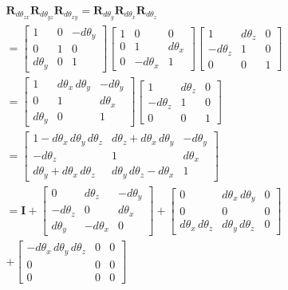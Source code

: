 \documentclass{article}      %
\newcommand{\BI}[0]{\mathbf{I}}
\newcommand{\BR}[0]{\mathbf{R}}
\begin{document}
\begin{multline*}
\BR_{d\theta_{zx}}
\BR_{d\theta_{yz}}
\BR_{d\theta_{xy}}
%
=
%
\BR_{d\theta_y}
\BR_{d\theta_x}
\BR_{d\theta_z} \\
%
=
%
\begin{bmatrix}
 1 & 0 & -d\theta_y \\
 0 & 1 & 0 \\
 d\theta_y & 0 & 1
\end{bmatrix}
\begin{bmatrix}
 1 & 0 & 0 \\
 0 & 1 & d\theta_x \\
 0 & -d\theta_x & 1
\end{bmatrix}
\begin{bmatrix}
1 & d\theta_z & 0 \\
-d\theta_z & 1 & 0 \\
0 & 0 & 1
\end{bmatrix} \\
%
=
%
\begin{bmatrix}
1 & d\theta_x\,d\theta_y & -d\theta_y \\
0 & 1 & d\theta_x \\
d\theta_y & 0 & 1
\end{bmatrix}
\begin{bmatrix}
1 & d\theta_z & 0 \\
-d\theta_z & 1 & 0 \\
0 & 0 & 1
\end{bmatrix} \\
%
=
%
\begin{bmatrix}
1-d\theta_x\,d\theta_y\,d\theta_z & d\theta_z + d\theta_x\,d\theta_y & -d\theta_y \\
-d\theta_z & 1 & d\theta_x \\
d\theta_y + d\theta_x\,d\theta_z & d\theta_y\,d\theta_z -d\theta_x & 1
\end{bmatrix} \\
%
=
%
\BI
+
\begin{bmatrix}
0 & d\theta_z & -d\theta_y \\
-d\theta_z & 0 & d\theta_x \\
d\theta_y & -d\theta_x & 0
\end{bmatrix}
+
\begin{bmatrix}
0 & d\theta_x\,d\theta_y & 0 \\
0 & 0 & 0 \\
d\theta_x\,d\theta_z & d\theta_y\,d\theta_z & 0
\end{bmatrix} \\
+
\begin{bmatrix}
-d\theta_x\,d\theta_y\,d\theta_z & 0 & 0 \\
0 & 0 & 0 \\
0 & 0 & 0
\end{bmatrix} \\
\end{multline*}
\end{document}
